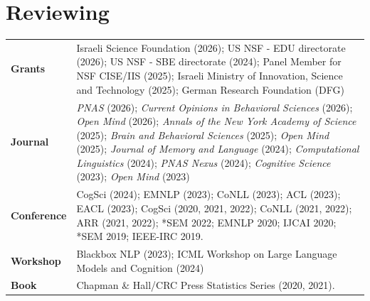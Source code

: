 \documentclass[11pt]{article}
\begin{document}
\section*{Reviewing}
\vspace{-1em}
\begin{longtable}{p{}  p{} }
    \textbf{Grants} & Israeli Science Foundation (2026); US NSF - EDU directorate (2026); US NSF - SBE directorate (2024); Panel Member for NSF CISE/IIS (2025); Israeli Ministry of Innovation, Science and Technology (2025); German Research Foundation (DFG)\\
    \textbf{Journal} & \textit{PNAS} (2026); \textit{Current Opinions in Behavioral Sciences} (2026); \textit{Open Mind} (2026); \textit{Annals of the New York Academy of Science} (2025); \textit{Brain and Behavioral Sciences} (2025); \textit{Open Mind} (2025); \textit{Journal of Memory and Language} (2024); \textit{Computational Linguistics} (2024); \textit{PNAS Nexus} (2024); \textit{Cognitive Science} (2023); \textit{Open Mind} (2023)\\
    \textbf{Conference} & CogSci (2024); EMNLP (2023); CoNLL (2023); ACL (2023); EACL (2023); CogSci (2020, 2021, 2022); CoNLL (2021, 2022); ARR (2021, 2022); *SEM 2022; EMNLP 2020; IJCAI 2020; *SEM 2019; IEEE-IRC 2019.\\
    \textbf{Workshop} & Blackbox NLP (2023); ICML Workshop on Large Language Models and Cognition (2024)\\
    \textbf{Book} & Chapman \& Hall/CRC Press Statistics Series (2020, 2021).
\end{longtable}
\end{document}
